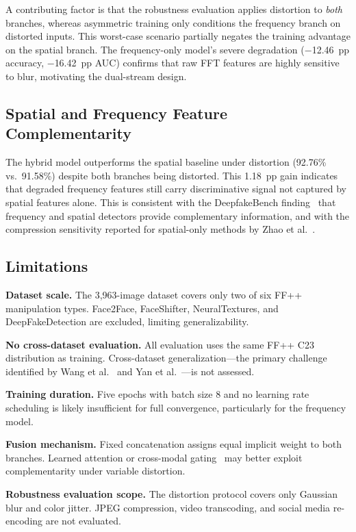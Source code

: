 \documentclass[conference]{IEEEtran}
\begin{document}
A contributing factor is that the robustness evaluation applies
distortion to \emph{both} branches, whereas asymmetric training only
conditions the frequency branch on distorted inputs. This worst-case
scenario partially negates the training advantage on the spatial
branch. The frequency-only model's severe degradation ($-$12.46~pp
accuracy, $-$16.42~pp AUC) confirms that raw FFT features are highly
sensitive to blur, motivating the dual-stream design.

\subsection{Spatial and Frequency Feature Complementarity}

The hybrid model outperforms the spatial baseline under distortion
(92.76\% vs.\ 91.58\%) despite both branches being distorted. This
1.18~pp gain indicates that degraded frequency features still carry
discriminative signal not captured by spatial features alone. This is
consistent with the DeepfakeBench finding~\cite{yan2023deepfakebench}
that frequency and spatial detectors provide complementary information,
and with the compression sensitivity reported for spatial-only methods
by Zhao et al.~\cite{zhao2021multiattentional}.

\subsection{Limitations}

\textbf{Dataset scale.} The 3,963-image dataset covers only two of
six FF++ manipulation types. Face2Face, FaceShifter, NeuralTextures,
and DeepFakeDetection are excluded, limiting generalizability.

\textbf{No cross-dataset evaluation.} All evaluation uses the same
FF++ C23 distribution as training. Cross-dataset generalization---the
primary challenge identified by Wang et al.~\cite{wang2024survey} and
Yan et al.~\cite{yan2024df40}---is not assessed.

\textbf{Training duration.} Five epochs with batch size 8 and no
learning rate scheduling is likely insufficient for full convergence,
particularly for the frequency model.

\textbf{Fusion mechanism.} Fixed concatenation assigns equal implicit
weight to both branches. Learned attention or cross-modal
gating~\cite{zhao2021multiattentional} may better exploit
complementarity under variable distortion.

\textbf{Robustness evaluation scope.} The distortion protocol covers
only Gaussian blur and color jitter. JPEG compression, video
transcoding, and social media re-encoding are not evaluated.
\end{document}
